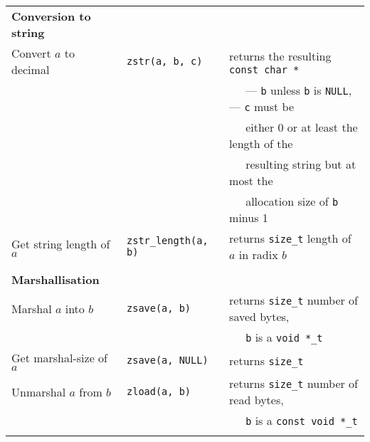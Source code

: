 \documentclass[10pt,draft]{article}
\begin{document}
\begin{tabular}{lll}
\textbf{Conversion to string} & {}                         & {}                                                \\
Convert $a$ to decimal        & {\tt zstr(a, b, c)}        & returns the resulting {\tt const char *}          \\
{}                            & {}                         & $~~~~~$ --- {\tt b} unless {\tt b} is {\tt NULL},
                                                                     --- {\tt c} must be                       \\
{}                            & {}                         & $~~~~~$ either 0 or at least the length of the    \\
{}                            & {}                         & $~~~~~$ resulting string but at most the          \\
{}                            & {}                         & $~~~~~$ allocation size of {\tt b} minus 1        \\
Get string length of $a$      & {\tt zstr\_length(a, b)}   & returns {\tt size\_t} length of $a$ in radix $b$  \\
\\

\textbf{Marshallisation}      & {}                         & {}                                                \\
Marshal $a$ into $b$          & {\tt zsave(a, b)}          & returns {\tt size\_t} number of saved bytes,      \\
{}                            & {}                         & $~~~~~$ {\tt b} is a {\tt void *\_t}              \\
Get marshal-size of $a$       & {\tt zsave(a, NULL)}       & returns {\tt size\_t}                             \\
Unmarshal $a$ from $b$        & {\tt zload(a, b)}          & returns {\tt size\_t} number of read bytes,       \\
{}                            & {}                         & $~~~~~$ {\tt b} is a {\tt const void *\_t}        \\
\\


\end{tabular}
\end{document}
